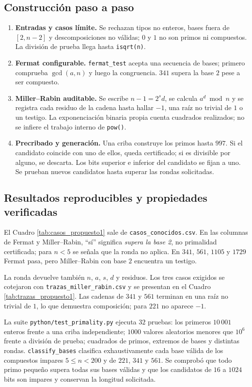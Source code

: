 \subsection{Construcción paso a paso}
\begin{enumerate}
\item \textbf{Entradas y casos límite.} Se rechazan tipos no enteros, bases fuera de $[2,n-2]$ y descomposiciones no válidas; $0$ y $1$ no son primos ni compuestos. La división de prueba llega hasta \texttt{isqrt(n)}.
\item \textbf{Fermat configurable.} \texttt{fermat\_test} acepta una secuencia de bases; primero comprueba $\gcd(a,n)$ y luego la congruencia. $341$ supera la base $2$ pese a ser compuesto.
\item \textbf{Miller--Rabin auditable.} Se escribe $n-1=2^sd$, se calcula $a^d\bmod n$ y se registra cada residuo de la cadena hasta hallar $-1$, una raíz no trivial de $1$ o un testigo. La exponenciación binaria propia cuenta cuadrados realizados; no se infiere el trabajo interno de \texttt{pow()}.
\item \textbf{Precribado y generación.} Una criba construye los primos hasta $997$. Si el candidato coincide con uno de ellos, queda certificado; si es divisible por alguno, se descarta. Los bits superior e inferior del candidato se fijan a uno. Se prueban nuevos candidatos hasta superar las rondas solicitadas.
\end{enumerate}

\subsection{Resultados reproducibles y propiedades verificadas}
El Cuadro \ref{tab:casos_propuesto1} sale de \texttt{casos\_conocidos.csv}. En las columnas de Fermat y Miller--Rabin, ``sí'' significa \emph{supera la base 2}, no primalidad certificada; para $n<5$ se señala que la ronda no aplica. En $341$, $561$, $1105$ y $1729$ Fermat pasa, pero Miller--Rabin con base $2$ encuentra un testigo.


La ronda devuelve también $n$, $a$, $s$, $d$ y residuos. Los tres casos exigidos se cotejaron con \texttt{trazas\_miller\_rabin.csv} y se presentan en el Cuadro \ref{tab:trazas_propuesto1}. Las cadenas de $341$ y $561$ terminan en una raíz no trivial de $1$, lo que demuestra composición; para $221$ no aparece $-1$.


La suite \texttt{python/test\_primality.py} ejecuta $32$ pruebas: los primeros $10\,001$ enteros frente a una criba independiente; $1000$ valores aleatorios menores que $10^6$ frente a división de prueba; cuadrados de primos, extremos de bases y distintas rondas. \texttt{classify\_bases} clasifica exhaustivamente cada base válida de los compuestos impares $5\le n<200$ y de $221$, $341$ y $561$. Se comprobó que todo primo pequeño supera todas sus bases válidas y que los candidatos de $16$ a $1024$ bits son impares y conservan la longitud solicitada.


